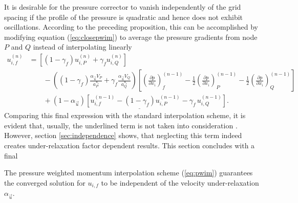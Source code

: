 It is desirable for the pressure corrector to vanish independently of the grid spacing if the profile of the pressure is quadratic and hence does not exhibit oscillations. According to the preceding proposition, this can be accomplished by modifying equation (\ref{eq:closepwim}) to average the pressure gradients from node \(P\) and \(Q\) instead of interpolating linearly
\begin{align}
  u_{i,f}^{(n)} 
  &=
  \left[\left(1 - \gamma_f\right) u_{i,P}^{(n)} + \gamma_f u_{i,Q}^{(n)} \right] \nonumber\\[1em]
  &\quad\quad - 
  \left(\left(1 - \gamma_f\right) \frac{\alpha_\vec{u} V_P}{a_P^{u_i}} + \gamma_f \frac{\alpha_\vec{u} V_Q}{a_Q^{u_i}}\right)
  \left[ 
  \left(\frac{\partial p}{\partial x_i}\right)_f^{(n-1)} 
  - \frac{1}{2} \left( \frac{\partial p}{\partial x_i} \right)_P^{(n-1)} 
  - \frac{1}{2} \left(\frac{\partial p}{\partial x_i}\right)_Q^{(n-1)}
  \right] \nonumber \\[1em]
  \label{eq:pwim}
  &\quad\quad + \underline{\left(1 - \alpha_\vec{u}\right) \left[ u_{i,f}^{(n-1)} - \left(1 - \gamma_f\right) u_{i,P}^{(n-1)} - \gamma_f \, u_{i,Q}^{(n-1)} \right]}.
\end{align}
Comparing this final expression with the standard interpolation scheme, it is evident that, usually, the underlined term is not taken into consideration \cite{ferziger02}. However, section \ref{sec:independence} shows, that neglecting this term indeed creates under-relaxation factor dependent results. This section concludes with a final
\begin{prop}
  The pressure weighted momentum interpolation scheme (\ref{eq:pwim}) guarantees the converged solution for \(u_{i,f}\) to be independent of the velocity under-relaxation \(\alpha_\vec{u}\).
\end{prop}
